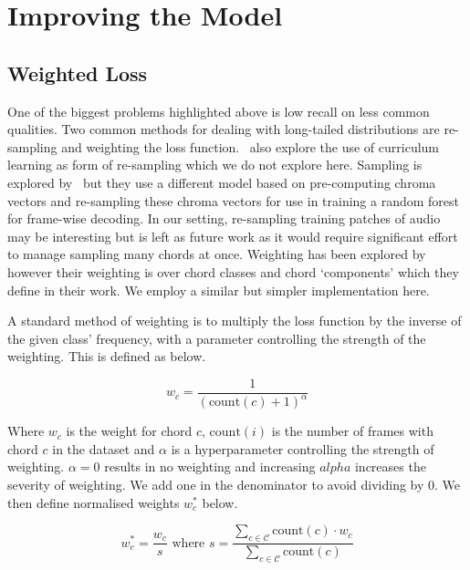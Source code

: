 \chapter{Improving the Model}

\section{Weighted Loss}

One of the biggest problems highlighted above is low recall on less common qualities. Two common methods for dealing with long-tailed distributions are re-sampling and weighting the loss function.~\citet{CurriculumLearning} also explore the use of curriculum learning as form of re-sampling which we do not explore here. Sampling is explored by~\citet{BalanceRandomForestACR} but they use a different model based on pre-computing chroma vectors and re-sampling these chroma vectors for use in training a random forest for frame-wise decoding. In our setting, re-sampling training patches of audio may be interesting but is left as future work as it would require significant effort to manage sampling many chords at once. Weighting has been explored by~\citet{ACRLargeVocab1} however their weighting is over chord classes and chord `components' which they define in their work. We employ a similar but simpler implementation here.

A standard method of weighting is to multiply the loss function by the inverse of the given class' frequency, with a parameter controlling the strength of the weighting. This is defined as below.

\begin{equation}
    w_c = \frac{1}{(\text{count}(c) + 1)^\alpha}
\end{equation}

Where $w_c$ is the weight for chord $c$, $\text{count}(i)$ is the number of frames with chord $c$ in the dataset and $\alpha$ is a hyperparameter controlling the strength of weighting. $\alpha=0$ results in no weighting and increasing $alpha$ increases the severity of weighting. We add one in the denominator to avoid dividing by $0$. We then define normalised weights $w_c^*$ below.

\begin{equation}\label{eq:weighted_loss}
    w_c^* = \frac{w_c}{s} \text{ where } s = \frac{\sum_{c\in \mathcal{C}} \text{count}(c)\cdot w_c}{\sum_{c\in \mathcal{C}} \text{count}(c)}
\end{equation}

